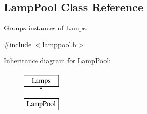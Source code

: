 \hypertarget{classLampPool}{\subsection{\-Lamp\-Pool \-Class \-Reference}
\label{classLampPool}
}


\-Groups instances of \hyperlink{classLamps}{\-Lamps}.  




{\ttfamily \#include $<$lamppool.\-h$>$}

\-Inheritance diagram for \-Lamp\-Pool\-:\begin{figure}[H]
\begin{center}
\leavevmode
\includegraphics[height=2.000000cm]{classLampPool}
\end{center}
\end{figure}
